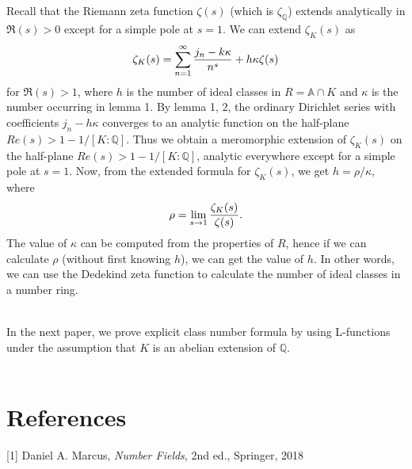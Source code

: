 \documentclass[11pt]{article}
\begin{document}
Recall that the Riemann zeta function $\zeta(s)$ (which is $\zeta_\mathbb{Q}$) extends analytically in $\Re(s)>0$ except for a simple pole at $s=1$. We can extend $\zeta_K(s)$ as
\begin{equation*}
\zeta_K(s)=\displaystyle\sum_{n=1}^{\infty}{j_n-k\kappa \over n^s}+h\kappa\zeta(s)
\end{equation*}
for $\Re(s)>1$, where $h$ is the number of ideal classes in $R=\mathbb{A}\cap K$ and $\kappa$ is the number occurring in lemma 1. By lemma 1, 2, the ordinary Dirichlet series with coefficients $j_n-h\kappa$ converges to an analytic function on the half-plane $Re(s)>1-1/[K:\mathbb{Q}]$. Thus we obtain a meromorphic extension of $\zeta_K(s)$ on the half-plane $Re(s)>1-1/[K:\mathbb{Q}]$, analytic everywhere except for a simple pole at $s=1$.
Now, from the extended formula for $\zeta_K(s)$, we get $h=\rho/\kappa$, where
\begin{equation*}
\rho=\lim_{s\to 1}{\zeta_K(s)\over \zeta(s)}.
\end{equation*}
The value of $\kappa$ can be computed from the properties of $R$, hence if we can calculate $\rho$ (without first knowing $h$), we can get the value of $h$. In other words, we can use the Dedekind zeta function to calculate the number of ideal classes in a number ring. 
\\
\\
\par
In the next paper, we prove explicit class number formula by using L-functions under the assumption that $K$ is an abelian extension of $\mathbb{Q}$.
\\
\\
\section*{References}
[1] Daniel A. Marcus, \textit{Number Fields}, 2nd ed., Springer, 2018
\end{document}
